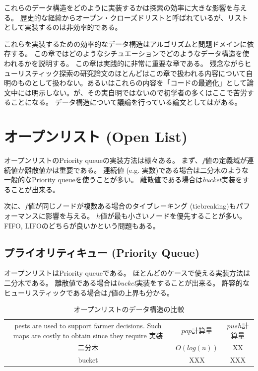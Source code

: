 \documentclass[10pt]{book}
\begin{document}
これらのデータ構造をどのように実装するかは探索の効率に大きな影響を与える。
歴史的な経緯からオープン・クローズドリストと呼ばれているが、リストとして実装するのは非効率的である。

これらを実装するための効率的なデータ構造はアルゴリズムと問題ドメインに依存する。
この章ではどのようなシチュエーションでどのようなデータ構造を使われるかを説明する。
この章は実践的に非常に重要な章である。
残念ながらヒューリスティック探索の研究論文のほとんどはこの章で扱われる内容について自明のものとして扱わない。あるいはこれらの内容を「コードの最適化」として論文中には明示しない。が、その実自明ではないので初学者の多くはここで苦労することになる。
データ構造について議論を行っている論文としては\cite{burns2012implementing}がある。




\section{オープンリスト (Open List)}
\label{sec:open-list}
オープンリストのPriority queueの実装方法は様々ある。
まず、$f$値の定義域が連続値か離散値かは重要である。
連続値 (e.g. 実数)である場合は二分木のような一般的なPriority queueを使うことが多い。
離散値である場合は{\it bucket}実装をすることが出来る。

次に、$f$値が同じノードが複数ある場合のタイブレーキング (tiebreaking)もパフォーマンスに影響を与える。
$h$値が最も小さいノードを優先することが多い。
FIFO, LIFOのどちらが良いかという問題もある。


\subsection{プライオリティキュー (Priority Queue)}
\label{sec:priority-queue}

オープンリストはPriority queueである。
ほとんどのケースで使える実装方法は二分木である。
離散値である場合は{\it bucket}実装をすることが出来る。
許容的なヒューリスティックである場合は$f$値の上界も分かる。

\begin{table}
\caption{オープンリストのデータ構造の比較}
\label{tbl:open-list-data-structure}
\begin{tabular}{ccc}pests are used to
support farmer decisions. Such maps are costly to obtain since they require 
	実装			& $pop$計算量	& $push$計算量 \\
	二分木		& $O(log(n))$  	& XX \\
	bucket 		& XXX			& XXX \\
\end{tabular}
\end{table}
\end{document}
